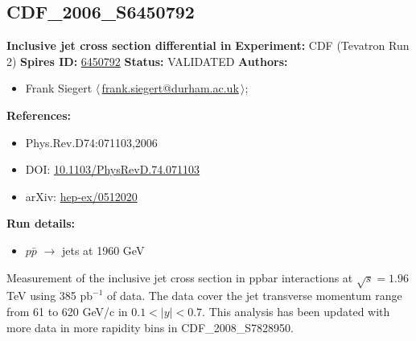 \subsection{CDF\_2006\_S6450792}
\textbf{Inclusive jet cross section differential in \pT}\newline
\textbf{Experiment:} CDF (Tevatron Run 2) \newline
\textbf{Spires ID:} \href{http://www.slac.stanford.edu/spires/find/hep/www?rawcmd=key+6450792}{6450792}\newline
\textbf{Status:} VALIDATED\newline
\textbf{Authors:}
\begin{itemize}
  \item Frank Siegert $\langle\,$\href{mailto:frank.siegert@durham.ac.uk}{frank.siegert@durham.ac.uk}$\,\rangle$;
\end{itemize}
\textbf{References:}
\begin{itemize}
  \item Phys.Rev.D74:071103,2006
  \item DOI: \href{http://dx.doi.org/10.1103/PhysRevD.74.071103}{10.1103/PhysRevD.74.071103}
  \item arXiv: \href{http://arxiv.org/abs/hep-ex/0512020}{hep-ex/0512020}
\end{itemize}
\textbf{Run details:}
\begin{itemize}

  \item $p\bar{p}$ \ensuremath{\to} jets at 1960 GeV\end{itemize}

\noindent Measurement of the inclusive jet cross section in ppbar interactions at $\sqrt{s}=1.96$ TeV using 385 $\mathrm{pb}^{-1}$ of data. The data cover the jet transverse momentum range from 61 to 620 GeV/c in $0.1 < |y| < 0.7$. This analysis has been updated with more data in more rapidity bins in CDF_2008_S7828950.

\clearpage


\clearpage

